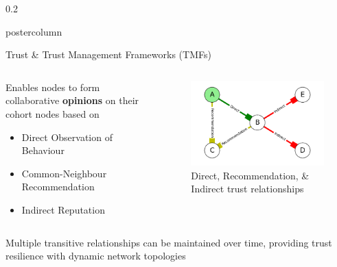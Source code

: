 \documentclass[final,hyperref={pdfpagelabels=false}]{beamer}
\def\colwidth{0.2\linewidth}
\begin{document}
\begin{frame}[fragile]
\begin{columns}[T]
\begin{column}{\colwidth}
\begin{beamercolorbox}[center,wd=\textwidth]{postercolumn}
\begin{minipage}[T]{.99\textwidth}
{\begin{block}{Trust \& Trust Management Frameworks (TMFs)}
							\begin{columns}[T]
								\begin{column}{0.416\textwidth}
									Enables nodes to form collaborative \textbf{opinions} on their cohort nodes based on
									\begin{itemize}
										\item Direct Observation of Behaviour
										\item Common-Neighbour Recommendation
										\item Indirect Reputation
									\end{itemize}
								\end{column}
								\begin{column}{0.416\textwidth}
									\begin{figure}[H]
										\centering
										\includegraphics[width=\linewidth]{node_relationships}
										\vspace{1ex}
										\caption{Direct, Recommendation, \& Indirect trust relationships}
									\end{figure}
								\end{column}
							\end{columns}
														
							\vspace{0.25\baselineskip}
														
							Multiple transitive relationships can be maintained over time, providing trust resilience with dynamic network topologies 
														
						\end{block}
					}
				\end{minipage}
			\end{beamercolorbox}
		\end{column}
				

\end{columns}
\end{frame}
\end{document}
